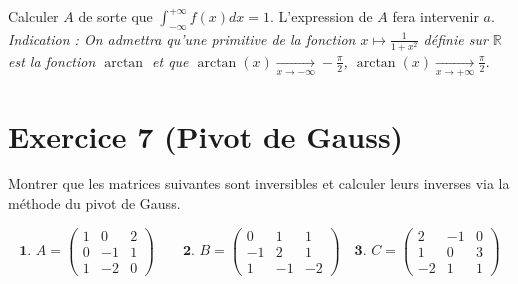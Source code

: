 \documentclass[5pt]{article}
\begin{document}
Calculer $A$ de sorte que $\int_{-\infty}^{+ \infty} f(x) dx = 1$. L'expression de $A$ fera intervenir $a$. \\
\textit{Indication : On admettra qu'une primitive de la fonction $x \mapsto \frac{1}{1+x^2}$ définie sur $\mathbb{R}$ est la fonction $\arctan$ et que $\arctan(x) \xrightarrow[x \to -\infty]{} -\frac{\pi}{2}$, $\arctan(x) \xrightarrow[x \to +\infty]{} \frac{\pi}{2}$}.

\section*{Exercice 7 (Pivot de Gauss)}

Montrer que les matrices suivantes sont inversibles et calculer leurs inverses via la méthode du pivot de Gauss.


\[
\textbf{1. } A = \begin{pmatrix}
1 & 0 & 2 \\
0 & -1 & 1 \\
1 & -2 & 0
\end{pmatrix}
\quad \quad
\textbf{2. } B = \begin{pmatrix}
0 & 1 & 1 \\
-1 & 2 & 1 \\
1 & -1 & -2
\end{pmatrix}
\quad
\textbf{3. } C = \begin{pmatrix}
2 & -1 & 0 \\
1 & 0 & 3 \\
-2 & 1 & 1
\end{pmatrix}
\]
\end{document}

